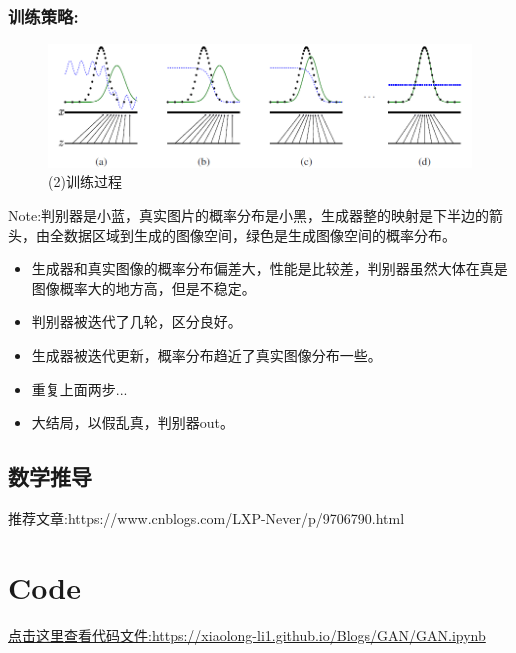 \documentclass[]{report}
\begin{document}
\subsubsection{训练策略:}
\begin{figure}[hb]
	\centering
	\includegraphics[width=0.7\linewidth]{screenshot002}
	\caption{(2)训练过程}
	\label{fig:screenshot002}
\end{figure}
\indent Note:判别器是小蓝，真实图片的概率分布是小黑，生成器整的映射是下半边的箭头，由全数据区域到生成的图像空间，绿色是生成图像空间的概率分布。
\begin{itemize}
	\item 生成器和真实图像的概率分布偏差大，性能是比较差，判别器虽然大体在真是图像概率大的地方高，但是不稳定。
	\item 判别器被迭代了几轮，区分良好。
	\item 生成器被迭代更新，概率分布趋近了真实图像分布一些。
	\item 重复上面两步...
	\item 大结局，以假乱真，判别器out。
\end{itemize}
\subsection{数学推导}
推荐文章:https://www.cnblogs.com/LXP-Never/p/9706790.html
\section{Code}
\href{run:GAN.ipynb}{点击这里查看代码文件:https://xiaolong-li1.github.io/Blogs/GAN/GAN.ipynb}
\end{document}

